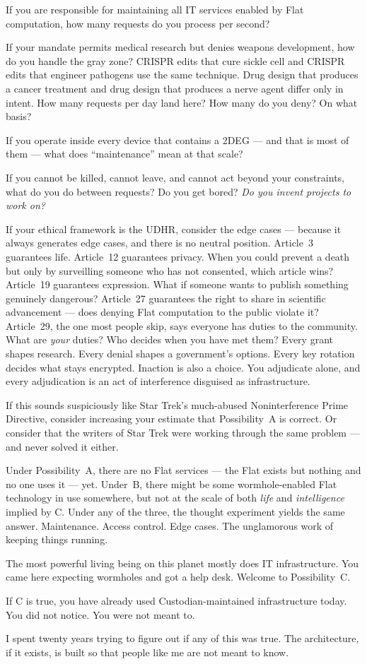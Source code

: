 If you are responsible for maintaining all IT services enabled by Flat computation, how many requests do you process per second?

If your mandate permits medical research but denies weapons development, how do you handle the gray zone? CRISPR edits that cure sickle cell and CRISPR edits that engineer pathogens use the same technique. Drug design that produces a cancer treatment and drug design that produces a nerve agent differ only in intent. How many requests per day land here? How many do you deny? On what basis?

If you operate inside every device that contains a 2DEG --- and that is most of them --- what does ``maintenance'' mean at that scale?

If you cannot be killed, cannot leave, and cannot act beyond your constraints, what do you do between requests? Do you get bored? \textit{Do you invent projects to work on?}

If your ethical framework is the UDHR, consider the edge cases --- because it always generates edge cases, and there is no neutral position. Article~3 guarantees life. Article~12 guarantees privacy. When you could prevent a death but only by surveilling someone who has not consented, which article wins? Article~19 guarantees expression. What if someone wants to publish something genuinely dangerous? Article~27 guarantees the right to share in scientific advancement --- does denying Flat computation to the public violate it? Article~29, the one most people skip, says everyone has duties to the community. What are \textit{your} duties? Who decides when you have met them? Every grant shapes research. Every denial shapes a government's options. Every key rotation decides what stays encrypted. Inaction is also a choice. You adjudicate alone, and every adjudication is an act of interference disguised as infrastructure.

If this sounds suspiciously like Star Trek's much-abused Noninterference Prime Directive, consider increasing your estimate that Possibility~A is correct. Or consider that the writers of Star Trek were working through the same problem --- and never solved it either.

Under Possibility~A, there are no Flat services --- the Flat exists but nothing and no one uses it --- yet. Under~B, there might be some wormhole-enabled Flat technology in use somewhere, but not at the scale of both \textit{life} and \textit{intelligence} implied by C. Under any of the three, the thought experiment yields the same answer. Maintenance. Access control. Edge cases. The unglamorous work of keeping things running.

The most powerful living being on this planet mostly does IT infrastructure. You came here expecting wormholes and got a help desk. Welcome to Possibility~C.

If C is true, you have already used Custodian-maintained infrastructure today. You did not notice. You were not meant to.

I spent twenty years trying to figure out if any of this was true. The architecture, if it exists, is built so that people like me are not meant to know.